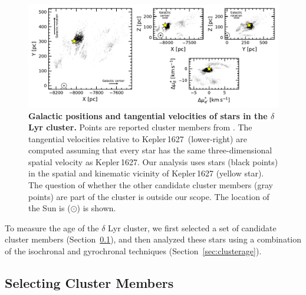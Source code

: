 \documentclass[12pt,modern,twocolumn,tighten]{aastex63}
\newcommand{\sn}{Kepler\,1627} %
\begin{document}
\begin{figure}[t]
	\begin{center}
		\leavevmode
		\includegraphics[width=1\textwidth]{f6.pdf}
	\end{center}
	\vspace{-0.7cm}
	\caption{
		{\bf Galactic positions and tangential velocities of stars in the
			$\delta$\,Lyr cluster.} Points are reported cluster members from
		\citet{kounkel_untangling_2019}.  
		The tangential velocities relative to
		\sn\ (lower-right) are computed assuming that every star has the same
		three-dimensional spatial velocity as \sn.
		Our analysis uses stars (black points)
		in the spatial and kinematic vicinity of Kepler\,1627 (yellow
		star).  The question of whether the other candidate cluster members
		(gray points) are part of the cluster is outside our scope.  The
		location of the Sun is ($\odot$) is shown.
		\label{fig:XYZvtang}
	}
\end{figure}


To measure the age of the $\delta$ Lyr cluster, we first selected
a set of candidate cluster members
(Section~\ref{sec:kinematicselection}), and then analyzed these stars using a
combination of the isochronal and gyrochronal techniques
(Section~\ref{sec:clusterage}).


\subsection{Selecting Cluster Members}
\label{sec:kinematicselection}
\end{document}
